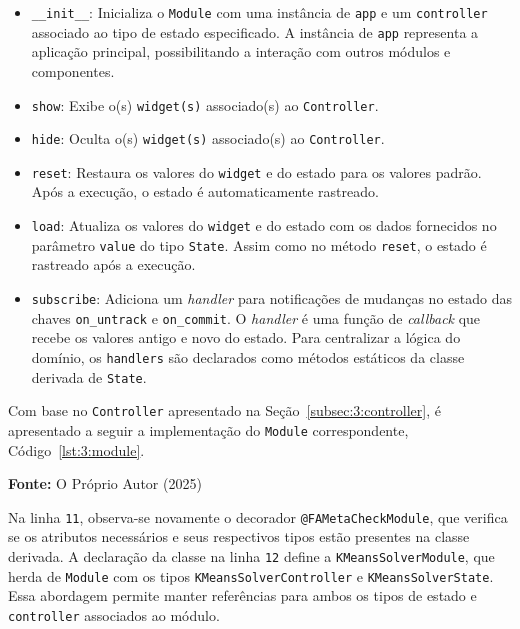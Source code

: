 \begin{itemize}
    \item \texttt{\_\_init\_\_}: Inicializa o \texttt{Module} com uma instância de \texttt{app} e um \texttt{controller} associado ao tipo de estado especificado. A instância de \texttt{app} representa a aplicação principal, possibilitando a interação com outros módulos e componentes.

    \item \texttt{show}: Exibe o(s) \texttt{widget(s)} associado(s) ao \texttt{Controller}.

    \item \texttt{hide}: Oculta o(s) \texttt{widget(s)} associado(s) ao \texttt{Controller}.

    \item \texttt{reset}: Restaura os valores do \texttt{widget} e do estado para os valores padrão. Após a execução, o estado é automaticamente rastreado.

    \item \texttt{load}: Atualiza os valores do \texttt{widget} e do estado com os dados fornecidos no parâmetro \texttt{value} do tipo \texttt{State}. Assim como no método \texttt{reset}, o estado é rastreado após a execução.

    \item \texttt{subscribe}: Adiciona um \textit{handler} para notificações de mudanças no estado das chaves \texttt{on\_untrack} e \texttt{on\_commit}. O \textit{handler} é uma função de \textit{callback} que recebe os valores antigo e novo do estado. Para centralizar a lógica do domínio, os \texttt{handlers} são declarados como métodos estáticos da classe derivada de \texttt{State}.
\end{itemize}

Com base no \texttt{Controller} apresentado na Seção~\ref{subsec:3:controller}, é apresentado a seguir a implementação do \texttt{Module} correspondente, Código~\ref{lst:3:module}.

\begin{center}
    
    \centerline{\textbf{Fonte:} O Próprio Autor (2025)}
\end{center}


\hfill \break

Na linha \texttt{11}, observa-se novamente o decorador \texttt{@FAMetaCheckModule}, que verifica se os atributos necessários e seus respectivos tipos estão presentes na classe derivada. A declaração da classe na linha \texttt{12} define a \texttt{KMeansSolverModule}, que herda de \texttt{Module} com os tipos \texttt{KMeansSolverController} e \texttt{KMeansSolverState}. Essa abordagem permite manter referências para ambos os tipos de estado e \texttt{controller} associados ao módulo.

